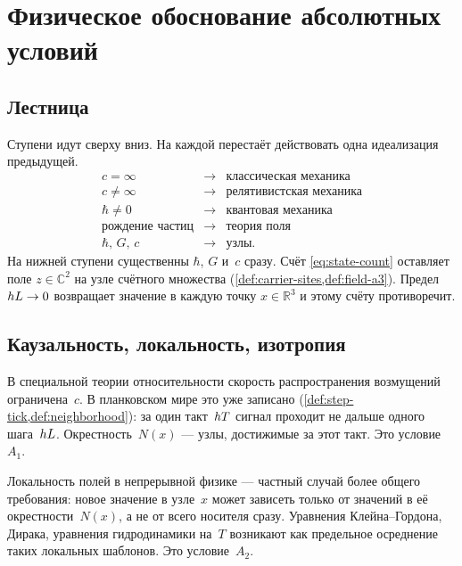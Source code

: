 \chapter{Физическое обоснование абсолютных условий}
\label{ch:axiom-rationale}

\section{Лестница}

Ступени идут сверху вниз.
На каждой перестаёт действовать одна идеализация предыдущей.
\begin{equation}
\label{eq:ladder}
\begin{array}{rcl}
c=\infty &\longrightarrow& \text{классическая механика}\\[0.45em]
c\neq\infty &\longrightarrow& \text{релятивистская механика}\\[0.45em]
\hbar\neq 0 &\longrightarrow& \text{квантовая механика}\\[0.45em]
\text{рождение частиц} &\longrightarrow& \text{теория поля}\\[0.45em]
\hbar,\,G,\,c &\longrightarrow& \text{узлы.}
\end{array}
\end{equation}
На нижней ступени существенны $\hbar$, $G$ и~$c$ сразу.
Счёт \eqref{eq:state-count} оставляет поле $z\in\mathbb{C}^2$
на узле счётного множества
(\cref{def:carrier-sites,def:field-a3}).
Предел $hL\to 0$ возвращает значение в каждую точку $x\in\mathbb{R}^3$
и этому счёту противоречит.

\section{Каузальность, локальность, изотропия}

В специальной теории относительности скорость распространения возмущений ограничена~$c$.
В планковском мире это уже записано (\cref{def:step-tick,def:neighborhood}):
за один такт~$hT$ сигнал проходит не дальше одного шага~$hL$.
Окрестность~$N(x)$ --- узлы, достижимые за этот такт.
Это условие~$A_1$.

Локальность полей в непрерывной физике --- частный случай более общего требования:
новое значение в узле~$x$ может зависеть только от значений в её окрестности~$N(x)$,
а не от всего носителя сразу.
Уравнения Клейна--Гордона, Дирака, уравнения гидродинамики на~$T$ возникают как предельное
осреднение таких локальных шаблонов.
Это условие~$A_2$.

